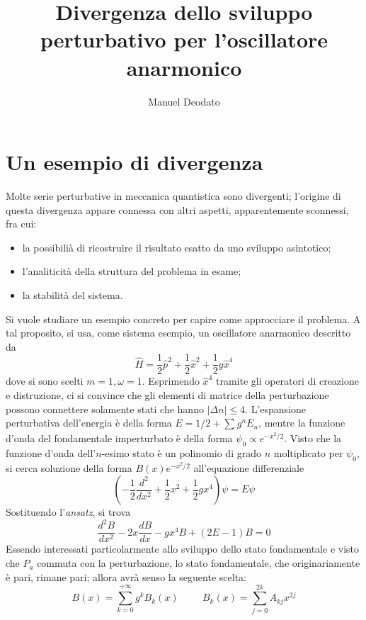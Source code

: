 \documentclass[10pt, a4paper]{scrartcl} %
\title{Divergenza dello sviluppo perturbativo per l'oscillatore anarmonico}
\author{Manuel Deodato}
\date{}
\renewcommand{\maketitle}{
\begin{center}
{\sffamily
{\fontsize{20}{20}\selectfont\MakeUppercase\thetitle}}

\vspace{0.2in}

{\large\scshape\sffamily\theauthor}
\end{center}
}
\numberwithin{equation}{section}
\theoremstyle{style2}
\theoremstyle{style1}
\begin{document}
\maketitle
\newpage
\tableofcontents
\newpage
\section{Un esempio di divergenza}
Molte serie perturbative in meccanica quantistica sono divergenti; l'origine di questa divergenza appare connessa con altri aspetti, apparentemente sconnessi, fra cui:
\begin{itemize}
	\item la possibili\`a di ricostruire il risultato esatto da uno sviluppo asintotico;
	\item l'analiticit\`a della struttura del problema in esame;
	\item la stabilit\`a del sistema.
\end{itemize}
Si vuole studiare un esempio concreto per capire come approcciare il problema.
A tal proposito, si usa, come sistema esempio, un oscillatore anarmonico descritto da
\begin{equation}
	\hat{H} = \frac{1}{2}\hat{p}^2 + \frac{1}{2}\hat{x}^2 + \frac{1}{2}g\hat{x}^4
\end{equation}
dove si sono scelti $m=1,\omega =1$.
Esprimendo $\hat{x}^4$ tramite gli operatori di creazione e distruzione, ci si convince che gli elementi di matrice della perturbazione possono connettere solamente stati che hanno $|\Delta  n| \le 4$.
L'espansione perturbativa dell'energia \`e della forma $E = 1/2 + \sum_{}^{} g^n E_n$, mentre la funzione d'onda del fondamentale imperturbato \`e della forma $\psi _0 \propto e^{-  x^2 / 2} $.
Visto che la funzione d'onda dell'$n$-esimo stato \`e un polinomio di grado $n$ moltiplicato per $\psi _0$, si cerca soluzione della forma $B(x) e^{-x^2 / 2} $ all'equazione differenziale
\begin{equation}
\left(	-\frac{1}{2} \frac{d ^2}{d x^2}  + \frac{1}{2}x^2  +\frac{1}{2}gx^4  \right) \psi  = E \psi 
\end{equation}
Sostituendo l'\textit{ansatz}, si trova
\[
\frac{d ^2B}{d x^2} - 2x \frac{d B}{d x}  - gx^4 B + (2E - 1) B = 0
\] 
Essendo interessati particolarmente allo sviluppo dello stato fondamentale e visto che $\hat{P}_a$ commuta con la perturbazione, lo stato fondamentale, che originariamente \`e pari, rimane pari; allora avr\`a senso la seguente scelta: 
\[
B(x) = \sum_{k=0}^{+\infty} g^k B_k(x) \hspace{1cm} B_k(x) = \sum_{j=0}^{2k} A_{kj} x^{2j} 
\] 
\end{document}
